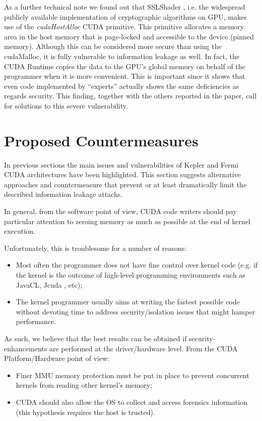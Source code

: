 \documentclass[11pt,onecolumn,letterpaper]{IEEEtran}
\begin{document}
As a further technical note we found out that SSLShader \cite{Jang:2011:SCS:1972457.1972459}, 
i.e. the widespread publicly available implementation of cryptographic algorithms on GPU, 
makes use of the \emph{cudaHostAlloc} CUDA primitive. 
This primitive allocates a memory area in the host memory that is page-locked and accessible to the device (pinned memory). 
Although this can be considered more secure than using the cudaMalloc, it is fully vulnerable to information leakage as well. 
In fact, the CUDA Runtime copies the data to the GPU's global memory on behalf of the programmer when it is more convenient. 
This is important since it shows that even code implemented by ``experts'' actually shows the same deficiencies as regards security. 
This finding, together with the others reported in the paper, call for solutions to this severe vulnerability.

\smallskip
\smallskip
\smallskip
\section{Proposed Countermeasures}
\label{countermeasures}
\label{remedies}
In previous sections the main issues and vulnerabilities of Kepler and Fermi CUDA architectures have been highlighted.
This section suggests alternative approaches and countermeasure that prevent or at least dramatically limit the described information leakage attacks.

In general, from the software point of view, CUDA code writers should pay particular attention
to zeroing memory as much as possible at the end of kernel execution. 

Unfortunately, this is troublesome for a number of reasons:
\begin{itemize}
 \item Most often the programmer does not have fine control over kernel code
 (e.g. if the kernel is the outcome of high-level programming environments such as JavaCL, Jcuda \cite{jcuda}, etc);
 \item The kernel programmer usually aims at writing the fastest possible code
 without devoting time to address security/isolation issues that might hamper performance.
\end{itemize}

As such, we believe that the best results can be obtained if security-enhancements are performed at the driver/hardware level.
From the CUDA Platform/Hardware point of view:
\begin{itemize}
 \item Finer MMU memory protection must be put in place to prevent concurrent kernels from reading other kernel's memory; 
 \item CUDA should also allow the OS to collect and access forensics information (this hypothesis requires the host is trusted).
\end{itemize}
\end{document}
